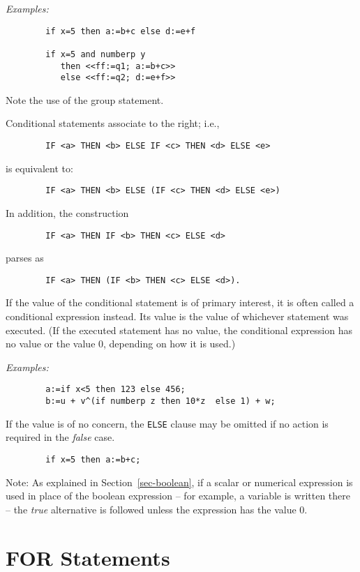 \textit{Examples:}
\begin{verbatim}
        if x=5 then a:=b+c else d:=e+f

        if x=5 and numberp y
           then <<ff:=q1; a:=b+c>>
           else <<ff:=q2; d:=e+f>>
\end{verbatim}
Note the use of the group statement.

Conditional statements associate to the right; i.e.,
\begin{verbatim}
        IF <a> THEN <b> ELSE IF <c> THEN <d> ELSE <e>
\end{verbatim}
is equivalent to:
\begin{verbatim}
        IF <a> THEN <b> ELSE (IF <c> THEN <d> ELSE <e>)
\end{verbatim}
In addition, the construction
\begin{verbatim}
        IF <a> THEN IF <b> THEN <c> ELSE <d>
\end{verbatim}
parses as
\begin{verbatim}
        IF <a> THEN (IF <b> THEN <c> ELSE <d>).
\end{verbatim}
If the value of the conditional statement is of primary interest, it is often called a conditional
expression instead.  Its value is the value of whichever statement was
executed. (If the executed statement has no value, the conditional
expression has no value or the value 0, depending on how it is used.)

\textit{Examples:}
\begin{verbatim}
        a:=if x<5 then 123 else 456;
        b:=u + v^(if numberp z then 10*z  else 1) + w;
\end{verbatim}
If the value is of no concern, the \texttt{ELSE} clause may be omitted if no
action is required in the \emph{false} case.
\begin{verbatim}
        if x=5 then a:=b+c;
\end{verbatim}
Note:  As explained in Section~\ref{sec-boolean},
if a scalar or numerical expression is used in place of
the boolean expression -- for example, a variable is written there -- the
\emph{true} alternative is followed unless the expression has the value 0.

\section{FOR Statements}
\hypertarget{command:FOR}{}
\hypertarget{command:FOREACH}{}
\hypertarget{reserved:IN}{}
\hypertarget{reserved:DO}{}
\hypertarget{reserved:SUM}{}
\hypertarget{reserved:PRODUCT}{}

